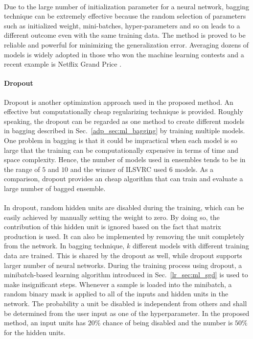 \paragraph{}
Due to the large number of initialization parameter for a neural network, bagging technique can be extremely effective because the random selection of parameters such as initialized weight, mini-batches, hyper-parameters and so on leads to a different outcome even with the same training data.
The method is proved to be reliable and powerful for minimizing the generalization error.
Averaging dozens of models is widely adopted in those who won the machine learning contests and a recent example is Netflix Grand Price \cite{koren2009}.


\paragraph{Dropout}
Dropout \cite{JMLR:v15:srivastava14a} is another optimization approach used in the proposed method.
An effective but computationally cheap regularizing technique is provided.
Roughly speaking, the dropout can be regarded as one method to create different models in bagging described in Sec.~\ref{adp_sec:ml_bagging} by training multiple models.
One problem in bagging is that it could be impractical when each model is so large that the training can be computationally expensive in terms of time and space complexity.
Hence, the number of models used in ensembles tends to be in the range of $5$ and $10$ and the winner of ILSVRC \cite{DBLP:journals/corr/SzegedyLJSRAEVR14} used $6$ models.
As a comparison, dropout provides an cheap algorithm that can train and evaluate a large number of bagged ensemble.

\paragraph{}
In dropout, random hidden units are disabled during the training, which can be easily achieved by manually setting the weight to zero.
By doing so, the contribution of this hidden unit is ignored based on the fact that matrix production is used.
It can also be implemented by removing the unit completely from the network.
In bagging technique, $k$ different models with different training data are trained.
This is shared by the dropout as well, while dropout supports larger number of neural networks.
During the training process using dropout, a minibatch-based learning algorithm introduced in Sec.~\ref{lr_sec:ml_sgd} is used to make insignificant steps.
Whenever a sample is loaded into the minibatch, a random binary mask is applied to all of the inputs and hidden units in the network.
The probability a unit be disabled is independent from others and shall be determined from the user input as one of the hyperparameter.
In the proposed method, an input units has $20\%$ chance of being disabled and the number is $50\%$ for the hidden units.


